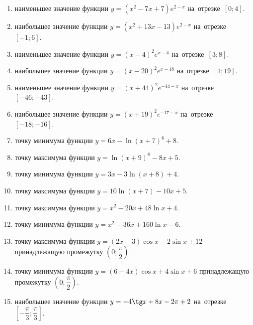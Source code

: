 \documentclass[a4paper,10pt]{article}
\begin{document}
\begin{enumerate}
\item {} наименьшее значение функции $y=\left(x^2 -7x +7\right)e^{2-x}$ на~отрезке~$\left[0;4\right]$.

\item {} наибольшее значение функции $y=\left(x^2 +13x -13\right)e^{2-x}$ на~отрезке~$\left[-1;6\right]$.

\item {} наименьшее значение функции $y=\left(x-4\right)^2e^{x-4}$ на~отрезке~$\left[3;8\right]$.

\item {} наибольшее значение функции $y=\left(x-20\right)^2e^{x-18}$ на~отрезке~$\left[1;19\right]$.

\item {} наименьшее значение функции $y=\left(x+44\right)^2e^{-44-x}$ на~отрезке~$\left[-46;-43\right]$.

\item {} наибольшее значение функции $y=\left(x+19\right)^2e^{-17-x}$ на~отрезке~$\left[-18;-16\right]$.

\item {} точку минимума функции $y=6x-\ln\left(x+7\right)^{6}+8$.

\item {} точку максимума функции $y=\ln\left(x+9\right)^{8}-8x+5$.

\item {} точку минимума функции $y=3x-3\ln\left(x+8\right)+4$.

\item {} точку максимума функции $y=10\ln\left(x+7\right)-10x+5$.

\item {} точку максимума функции $y=x^2-20x+48\ln x +4$.

\item {} точку минимума функции $y=x^2-36x+160\ln x -6$.

\item {} точку максимума функции $y=\left(2x-3\right)\cos x -2\sin x+12$
принадлежащую промежутку $\left(0;\dfrac{\pi}{2}\right)$.

\item {} точку минимума функции $y=\left(6-4x\right)\cos x +4\sin x+6$
принадлежащую промежутку $\left(0;\dfrac{\pi}{2}\right)$.

\item {} наибольшее значение функции $y=-4\tg x +8x-2\pi +2$ на~отрезке~$\left[-\dfrac{\pi}{3};\dfrac{\pi}{3}\right]$.


\end{enumerate}
\end{document}
